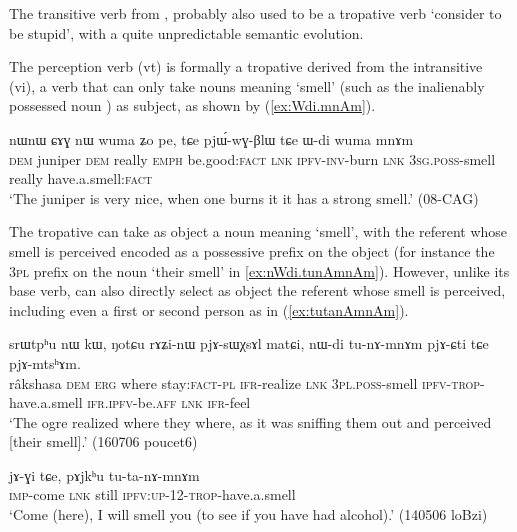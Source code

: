 The transitive verb  from , probably also used to be a tropative verb `consider to be stupid', with a quite unpredictable semantic evolution.

The perception verb  (vt) is formally a tropative derived from the intransitive  (vi), a verb that can only take nouns meaning `smell' (such as the inalienably possessed noun ) as subject, as shown by (\ref{ex:Wdi.mnAm}).

\begin{exe}
\ex \label{ex:Wdi.mnAm}
\gll nɯnɯ ɕɤɣ nɯ wuma ʑo pe, tɕe pjɯ́-wɣ-βlɯ tɕe ɯ-di wuma mnɤm \\
\textsc{dem} juniper \textsc{dem} really \textsc{emph} be.good:\textsc{fact} \textsc{lnk} \textsc{ipfv}-\textsc{inv}-burn \textsc{lnk} \textsc{3sg}.\textsc{poss}-smell really have.a.smell:\textsc{fact} \\
\glt `The juniper is very nice, when one burns it it has a strong smell.' (08-CAG)
\end{exe}

The tropative  can take as object a noun meaning `smell', with the referent whose smell is perceived encoded as a possessive prefix on the object (for instance the \textsc{3pl} prefix on the noun  `their smell' in \ref{ex:nWdi.tunAmnAm}). However, unlike its base verb,  can also directly select as object the referent whose smell is perceived, including even a first or second person as in (\ref{ex:tutanAmnAm}).

\begin{exe}
\ex \label{ex:nWdi.tunAmnAm}
\gll srɯtpʰu nɯ kɯ, ŋotɕu rɤʑi-nɯ pjɤ-sɯχsɤl matɕi, nɯ-di tu-nɤ-mnɤm pjɤ-ɕti tɕe pjɤ-mtsʰɤm. \\
râkshasa \textsc{dem} \textsc{erg} where stay:\textsc{fact}-\textsc{pl} \textsc{ifr}-realize \textsc{lnk} \textsc{3pl}.\textsc{poss}-smell \textsc{ipfv}-\textsc{trop}-have.a.smell \textsc{ifr}.\textsc{ipfv}-be.\textsc{aff} \textsc{lnk} \textsc{ifr}-feel \\
\glt `The ogre realized where they where, as it was sniffing them out and perceived [their smell].' (160706 poucet6)
\end{exe}


\begin{exe}
\ex \label{ex:tutanAmnAm}
\gll  jɤ-ɣi tɕe, pɤjkʰu tu-ta-nɤ-mnɤm \\
\textsc{imp}-come \textsc{lnk} still \textsc{ipfv}:\textsc{up}-1\fl{}2-\textsc{trop}-have.a.smell \\
\glt `Come (here), I will smell you (to see if you have had alcohol).' (140506 loBzi)
\end{exe}

